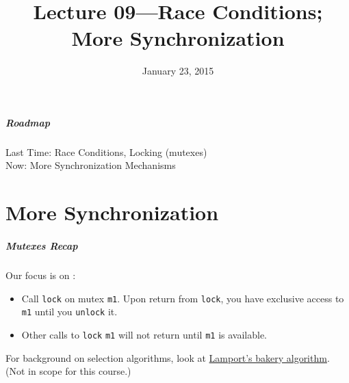 \documentclass[aspectratio=43]{beamer}
\title{Lecture 09---Race Conditions; More Synchronization}
\date{January 23, 2015}
\newenvironment{changemargin}[1]{%
  \begin{list}{}{%
    \setlength{\topsep}{0pt}%
    \setlength{\leftmargin}{#1}%
    \setlength{\rightmargin}{1em}
    \setlength{\listparindent}{\parindent}%
    \setlength{\itemindent}{\parindent}%
    \setlength{\parsep}{\parskip}%
  }%
  \item[]}{\end{list}}
\begin{document}
\begin{frame}[plain]
  \titlepage
\end{frame}

\begin{frame}
  \frametitle{Roadmap}

  \Large
    \begin{changemargin}{2cm}
      Last Time: Race Conditions, Locking (mutexes)\\[1em]
      Now: More Synchronization Mechanisms
    \end{changemargin}
  
\end{frame}


\part{More Synchronization}
\frame{\partpage}
\begin{frame}
  \frametitle{Mutexes Recap}

  \begin{changemargin}{2.5cm}
     Our focus is on :
  \begin{itemize}
    \item Call {\tt lock} on mutex {\tt m1}. Upon return from
      {\tt lock}, you have exclusive access to {\tt m1} until you
      {\tt unlock} it.
    \item Other calls to {\tt lock} {\tt m1} will not return
      until {\tt m1} is available.
    \end{itemize}
    For background on selection algorithms, look at
      \href{http://en.wikipedia.org/wiki/Lamport\%27s_bakery_algorithm}
      {Lamport's bakery algorithm}. \\ (Not in scope for this
      course.)
  \end{changemargin}
\end{frame}
\end{document}
